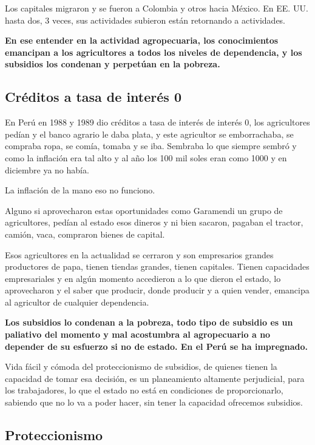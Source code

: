 \documentclass[
  letterpaper,
  DIV=11,
  numbers=noendperiod]{scrartcl}
\begin{document}
Los capitales migraron y se fueron a Colombia y otros hacia México. En
EE. UU. hasta dos, 3 veces, sus actividades subieron están retornando a
actividades.

\textbf{En ese entender en la actividad agropecuaria, los conocimientos
emancipan a los agricultores a todos los niveles de dependencia, y los
subsidios los condenan y perpetúan en la pobreza.}

\hypertarget{cruxe9ditos-a-tasa-de-interuxe9s-0}{%
\subsection{Créditos a tasa de interés
0}\label{cruxe9ditos-a-tasa-de-interuxe9s-0}}

En Perú en 1988 y 1989 dio créditos a tasa de interés de interés 0, los
agricultores pedían y el banco agrario le daba plata, y este agricultor
se emborrachaba, se compraba ropa, se comía, tomaba y se iba. Sembraba
lo que siempre sembró y como la inflación era tal alto y al año los 100
mil soles eran como 1000 y en diciembre ya no había.

La inflación de la mano eso no funciono.

Alguno si aprovecharon estas oportunidades como Garamendi un grupo de
agricultores, pedían al estado esos dineros y ni bien sacaron, pagaban
el tractor, camión, vaca, compraron bienes de capital.

Esos agricultores en la actualidad se cerraron y son empresarios grandes
productores de papa, tienen tiendas grandes, tienen capitales. Tienen
capacidades empresariales y en algún momento accedieron a lo que dieron
el estado, lo aprovecharon y el saber que producir, donde producir y a
quien vender, emancipa al agricultor de cualquier dependencia.

\textbf{Los subsidios lo condenan a la pobreza, todo tipo de subsidio es
un paliativo del momento y mal acostumbra al agropecuario a no depender
de su esfuerzo si no de estado. En el Perú se ha impregnado.}

Vida fácil y cómoda del proteccionismo de subsidios, de quienes tienen
la capacidad de tomar esa decisión, es un planeamiento altamente
perjudicial, para los trabajadores, lo que el estado no está en
condiciones de proporcionarlo, sabiendo que no lo va a poder hacer, sin
tener la capacidad ofrecemos subsidios.

\hypertarget{proteccionismo}{%
\subsection{Proteccionismo}\label{proteccionismo}}
\end{document}

